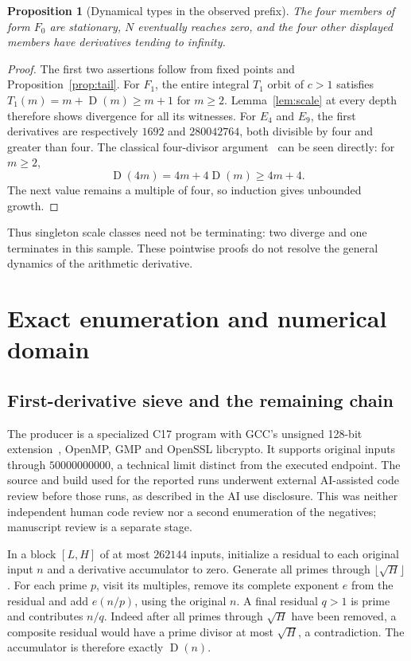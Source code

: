 \documentclass[11pt]{article}
\newcommand{\D}{\operatorname{D}}
\newtheorem{proposition}[theorem]{Proposition}
\theoremstyle{definition}
\theoremstyle{remark}
\begin{document}
\begin{proposition}[Dynamical types in the observed prefix]\label{prop:dynamics}
The four members of form $F_0$ are stationary, $N$ eventually reaches
zero, and the four other displayed members have derivatives tending
to infinity.
\end{proposition}
\begin{proof}
The first two assertions follow from fixed points and
Proposition~\ref{prop:tail}. For $F_1$, the entire integral
$T_1$ orbit of $c>1$ satisfies $T_1(m)=m+\D(m)\ge m+1$
for $m\ge2$. Lemma~\ref{lem:scale} at every depth therefore shows
divergence for all its witnesses.
For $E_4$ and $E_9$, the first derivatives are respectively
$1692$ and $280042764$, both divisible by four and greater than four.
The classical four-divisor argument~\cite[Theorem 4]{ufnarovski}
can be seen directly: for $m\ge2$,
\[
 \D(4m)=4m+4\D(m)\ge4m+4.
\]
The next value remains a multiple of four, so induction gives
unbounded growth.
\end{proof}
Thus singleton scale classes need not be terminating: two diverge and
one terminates in this sample. These pointwise proofs do not resolve
the general dynamics of the arithmetic derivative.

\section{Exact enumeration and numerical domain}\label{sec:method}

\subsection{First-derivative sieve and the remaining chain}

The producer is a specialized C17 program with GCC's unsigned
128-bit extension~\cite{gcc}, OpenMP, GMP and OpenSSL libcrypto.
It supports original inputs through $50000000000$, a technical
limit distinct from the executed endpoint. The source and build used
for the reported runs underwent external AI-assisted code review
before those runs, as described in the AI use disclosure. This was
neither independent human code review nor a second enumeration of
the negatives; manuscript review is a separate stage.

In a block $[L,H]$ of at most $262144$ inputs, initialize a residual
to each original input $n$ and a derivative accumulator to zero.
Generate all primes through $\lfloor\sqrt H\rfloor$. For each prime
$p$, visit its multiples, remove its complete exponent $e$ from
the residual and add $e(n/p)$, using the original $n$. A final
residual $q>1$ is prime and contributes $n/q$. Indeed after all
primes through $\sqrt H$ have been removed, a composite residual
would have a prime divisor at most $\sqrt H$, a contradiction.
The accumulator is therefore exactly $\D(n)$.
\end{document}
